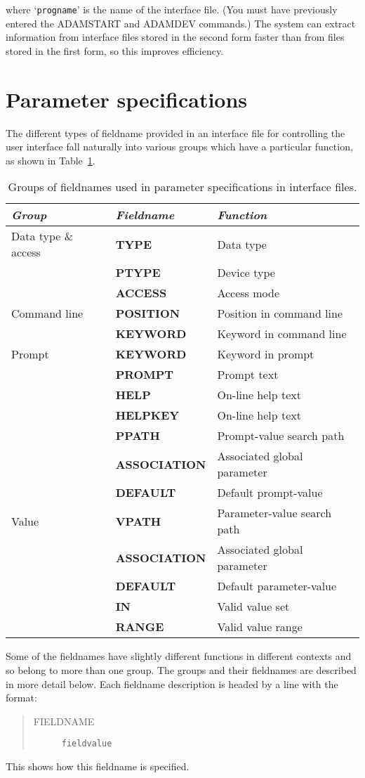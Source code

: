 where `\verb+progname+' is the name of the interface file.
(You must have previously entered the ADAMSTART and ADAMDEV commands.)
The system can extract information from interface files stored in the second
form faster than from files stored in the first form, so this improves
efficiency.

\section{Parameter specifications}

The different types of fieldname provided in an interface file for controlling
the user interface fall naturally into various groups which have a particular
function, as shown in Table~\ref{T_fields}.
\begin{table}[htb]
\centering
\begin{tabular}{|l|l|l|} \hline
{\em Group} & {\em Fieldname} & {\em Function} \\
\hline
Data type \& access & {\bf TYPE} & Data type \\
& {\bf PTYPE} & Device type \\
& {\bf ACCESS} & Access mode \\
\hline
Command line & {\bf POSITION} & Position in command line \\
& {\bf KEYWORD} & Keyword in command line \\
\hline
Prompt & {\bf KEYWORD} & Keyword in prompt \\
& {\bf PROMPT} & Prompt text \\
& {\bf HELP} & On-line help text \\
& {\bf HELPKEY} & On-line help text \\
& {\bf PPATH} & Prompt-value search path \\
& {\bf ASSOCIATION} & Associated global parameter \\
& {\bf DEFAULT} & Default prompt-value \\
\hline
Value & {\bf VPATH} & Parameter-value search path \\
& {\bf ASSOCIATION} & Associated global parameter \\
& {\bf DEFAULT} & Default parameter-value \\
& {\bf IN} & Valid value set \\
& {\bf RANGE} & Valid value range \\
\hline
\end{tabular}
\caption{Groups of fieldnames used in parameter specifications in interface
 files.}
\label{T_fields}
\end{table}
Some of the fieldnames have slightly different functions in different contexts
and so belong to more than one group.
The groups and their fieldnames are described in more detail below.
Each fieldname description is headed by a line with the format:
\begin{quote}
\begin{description}
\item [FIELDNAME] {\tt fieldvalue}
\end{description}
\end{quote}
This shows how this fieldname is specified.

